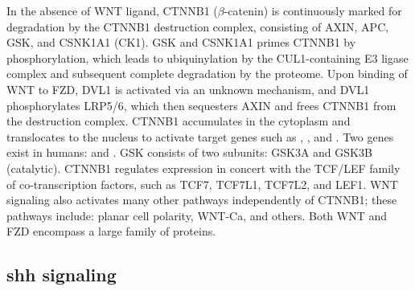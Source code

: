 		In the absence of WNT ligand, CTNNB1 ($\beta$-catenin) is continuously marked for degradation by the CTNNB1 destruction complex, consisting of AXIN, APC, GSK, and CSNK1A1 (CK1). GSK and CSNK1A1 primes CTNNB1 by phosphorylation, which leads to ubiquinylation by the CUL1-containing E3 ligase complex and subsequent complete degradation by the proteome. Upon binding of WNT to FZD, DVL1 is activated via an unknown mechanism, and DVL1 phosphorylates LRP5/6, which then sequesters AXIN and frees CTNNB1 from the destruction complex. CTNNB1 accumulates in the cytoplasm and translocates to the nucleus to activate target genes such as , , and . Two  genes exist in humans:  and . GSK consists of two subunits: GSK3A and GSK3B (catalytic). CTNNB1 regulates expression in concert with the TCF/LEF family of co-transcription factors, such as TCF7, TCF7L1, TCF7L2, and LEF1. WNT signaling also activates many other pathways independently of CTNNB1; these pathways include: planar cell polarity, WNT-Ca, and others. Both WNT and FZD encompass a large family of proteins.


\subsection{\gls{shh} signaling}

